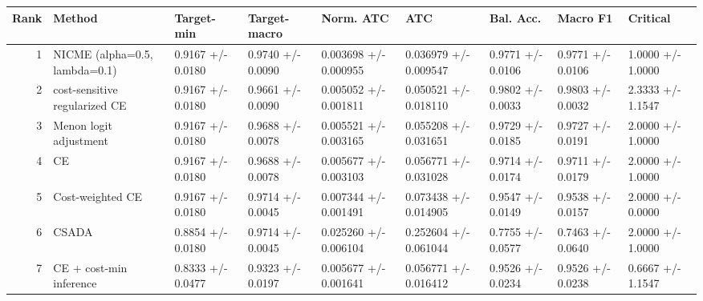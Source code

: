 \begin{tabular}{rllllllll}
\toprule
Rank & Method & Target-min & Target-macro & Norm. ATC & ATC & Bal. Acc. & Macro F1 & Critical \\
\midrule
1 & NICME (alpha=0.5, lambda=0.1) & 0.9167 +/- 0.0180 & 0.9740 +/- 0.0090 & 0.003698 +/- 0.000955 & 0.036979 +/- 0.009547 & 0.9771 +/- 0.0106 & 0.9771 +/- 0.0106 & 1.0000 +/- 1.0000 \\
2 & cost-sensitive regularized CE & 0.9167 +/- 0.0180 & 0.9661 +/- 0.0090 & 0.005052 +/- 0.001811 & 0.050521 +/- 0.018110 & 0.9802 +/- 0.0033 & 0.9803 +/- 0.0032 & 2.3333 +/- 1.1547 \\
3 & Menon logit adjustment & 0.9167 +/- 0.0180 & 0.9688 +/- 0.0078 & 0.005521 +/- 0.003165 & 0.055208 +/- 0.031651 & 0.9729 +/- 0.0185 & 0.9727 +/- 0.0191 & 2.0000 +/- 1.0000 \\
4 & CE & 0.9167 +/- 0.0180 & 0.9688 +/- 0.0078 & 0.005677 +/- 0.003103 & 0.056771 +/- 0.031028 & 0.9714 +/- 0.0174 & 0.9711 +/- 0.0179 & 2.0000 +/- 1.0000 \\
5 & Cost-weighted CE & 0.9167 +/- 0.0180 & 0.9714 +/- 0.0045 & 0.007344 +/- 0.001491 & 0.073438 +/- 0.014905 & 0.9547 +/- 0.0149 & 0.9538 +/- 0.0157 & 2.0000 +/- 0.0000 \\
6 & CSADA & 0.8854 +/- 0.0180 & 0.9714 +/- 0.0045 & 0.025260 +/- 0.006104 & 0.252604 +/- 0.061044 & 0.7755 +/- 0.0577 & 0.7463 +/- 0.0640 & 2.0000 +/- 1.0000 \\
7 & CE + cost-min inference & 0.8333 +/- 0.0477 & 0.9323 +/- 0.0197 & 0.005677 +/- 0.001641 & 0.056771 +/- 0.016412 & 0.9526 +/- 0.0234 & 0.9526 +/- 0.0238 & 0.6667 +/- 1.1547 \\
\bottomrule
\end{tabular}
